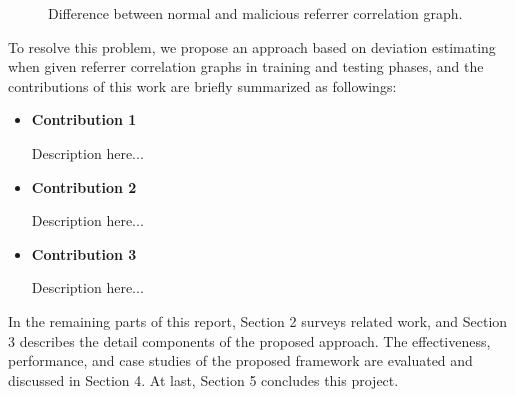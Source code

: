 \begin{figure}[!tbp]
  \centering
  \hfill
  \caption{Difference between normal and malicious referrer correlation graph.}
\label{fig:length_count}
\end{figure}

To resolve this problem, we propose an approach based on deviation estimating when given referrer correlation graphs in training and testing phases, and the contributions of this work are briefly summarized as followings:

\begin{itemize}

\item {\bf Contribution 1}

Description here...

\item {\bf Contribution 2}

Description here...

\item {\bf Contribution 3}

Description here...

\end{itemize}

In the remaining parts of this report, Section 2 surveys related work, and Section 3 describes the detail components of the proposed approach. The effectiveness, performance, and case studies of the proposed framework are evaluated and discussed in Section 4. At last, Section 5 concludes this project.
